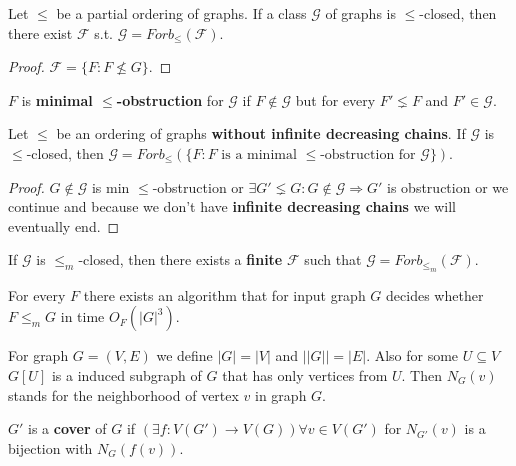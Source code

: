 \begin{lemma}
	Let $\leq$ be a partial ordering of graphs. If a class $\mathcal{G}$ of graphs is $\leq$-closed, then there exist $\mathcal{F}$ s.t. $\mathcal{G} = Forb_{\leq}(\mathcal{F})$.
\end{lemma}

\begin{proof}
	$\mathcal{F} = \{F : F \nleq G\}$.
\end{proof}

\begin{defn}
	$F$ is \textbf{minimal $\leq$-obstruction} for $\mathcal{G}$ if $F \notin \mathcal{G}$ but for every $F' \lneq F$ and $F' \in \mathcal{G}$.
\end{defn}

\begin{lemma}
	Let $\leq$ be an ordering of graphs \textbf{without infinite decreasing chains}. If $\mathcal{G}$ is $\leq$-closed, then $\mathcal{G} = Forb_{\leq}(\{F : F \text{ is a minimal } \leq\text{-obstruction for } \mathcal{G}\})$.
\end{lemma}

\begin{proof}
	$G \notin \mathcal{G}$ is min $\leq$-obstruction or $\exists G' \lneq G : G \notin \mathcal{G} \Rightarrow G'$ is obstruction or we continue and because we don't have \textbf{infinite decreasing chains} we will eventually end.
\end{proof}

If $\mathcal{G}$ is $\leq_{m}$-closed, then there exists a \textbf{finite} $\mathcal{F}$ such that $\mathcal{G} = Forb_{\leq_{m}}(\mathcal{F})$.

\begin{thm}
	For every $F$ there exists an algorithm that for input graph $G$ decides whether $F \leq_{m} G$ in time $O_{F}(|G|^{3})$.
\end{thm}

\begin{defn}
	For graph $G = (V,E)$ we define $|G| = |V|$ and $||G|| = |E|$. Also for some $U \subseteq V$ $G[U]$ is a induced subgraph of $G$ that has only vertices from $U$. Then $N_{G}(v)$ stands for the neighborhood of vertex $v$ in graph $G$.
\end{defn}

\begin{defn}
	$G'$ is a \textbf{cover} of $G$ if $(\exists f : V(G') \to V(G)) \forall v \in V(G')$ for $N_{G'}(v)$ is a bijection with $N_{G}(f(v))$.
\end{defn}

